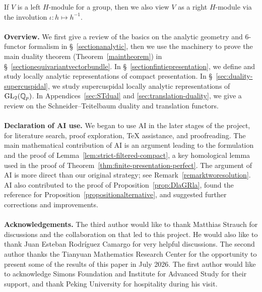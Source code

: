 \documentclass[a4paper,10pt]{amsart}
\theoremstyle{remark}
\theoremstyle{definition}
\theoremstyle{plain}
\numberwithin{equation}{section}
\newcommand{\bbQ}{{\mathbb Q}}
\newcommand{\GL}{{\rm GL}}
\begin{document}
If $V$ is a left $H$-module for a group, then we also view $V$ as a right $H$-module via the involution $\iota:h\mapsto h^{-1}$.
\\
\\
\noindent\textbf{Overview.} We first give a review of the basics on the analytic geometry and $6$-functor formalism in \S~\ref{sectionanalytic}, then we use the machinery to prove the main duality theorem (Theorem~\ref{maintheorem}) in \S~\ref{sectionequivariantvectorbundle}. In \S~\ref{sectionfintiepresentation}, we define and study locally analytic representations of compact presentation. In \S~\ref{sec:duality-supercuspidal}, we study supercuspidal locally analytic representations of $\GL_2(\bbQ_p)$. In Appendices~\ref{sec:STdual} and \ref{sec:translation-duality}, we give a review on the Schneider--Teitelbaum duality and translation functors.
\\
\\
\noindent\textbf{Declaration of AI use.}
We began to use AI in the later stages of the project, for literature search, proof exploration, {\TeX} assistance, and proofreading. The main mathematical contribution of AI is an argument leading to the formulation and the proof of Lemma~\ref{lem:strict-filtered-compact}, a key homological lemma used in the proof of Theorem~\ref{thm:finite-presentation-perfect}. The argument of AI is more direct than our original strategy; see Remark~\ref{remarktworesolution}. AI also contributed to the proof of Proposition~\ref{prop:DlaGRla}, found the reference for Proposition~\ref{propositionalternative}, and suggested further corrections and improvements.
\\
\\
\noindent\textbf{Acknowledgements.} The third author would like to thank Matthias Strauch for discussions and the collaboration on \cite{strauch2025bernsteinzelevinskydualitylocallyanalytic} that led to this project. He would also like to thank Juan Esteban Rodríguez Camargo for very helpful discussions. The second author thanks the Tianyuan Mathematics Research Center for the opportunity to present some of the results of this paper in July 2026. The first author would like to acknowledge Simons Foundation and Institute for Advanced Study for their support, and thank Peking University for hospitality during his visit.
\end{document}
